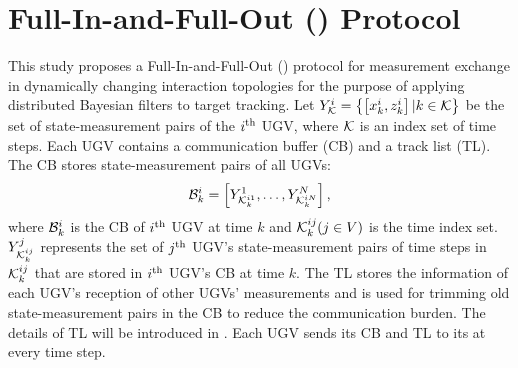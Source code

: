 \section{Full-In-and-Full-Out (\proto) Protocol}\label{sec:\proto}		
	This study proposes a Full-In-and-Full-Out (\proto) protocol for measurement exchange in dynamically changing interaction topologies for the purpose of applying distributed Bayesian filters to target tracking.
	Let \small$Y^i_{\mathcal{K}}=\left\lbrace \left[x^i_k,z^i_k\right]|k\in \mathcal{K}\right\rbrace$\normalsize 
	be the set of state-measurement pairs of the $i^\text{th}$ UGV, where $\mathcal{K}$ is an index set of time steps.
	Each UGV contains a communication buffer (CB) and a track list (TL). 
	The CB stores state-measurement pairs 
	of all UGVs:
	\small\begin{equation*}		
		\mathcal{B}^i_k=\left[ Y^1_{\mathcal{K}^{i1}_k},\dots,Y^N_{\mathcal{K}^{iN}_k}\right],
	\end{equation*}\normalsize
	where $\mathcal{B}^i_k$ is the CB of $i^\text{th}$ UGV at time $k$ and $\mathcal{K}^{ij}_k (j\in V)$ is the time index set.
	$Y^j_{\mathcal{K}^{ij}_k}$ represents the set of $j^\text{th}$ UGV's state-measurement pairs of time steps in $\mathcal{K}^{ij}_k$ that are stored in $i^\text{th}$ UGV's CB at time $k$.	
	The TL stores the information of each UGV's reception of other UGVs' measurements and is used for trimming old state-measurement pairs in the CB to reduce the communication burden.
	The details of TL will be introduced in .
	Each UGV sends its CB and TL to its {\onbhd} at every time step.
	
